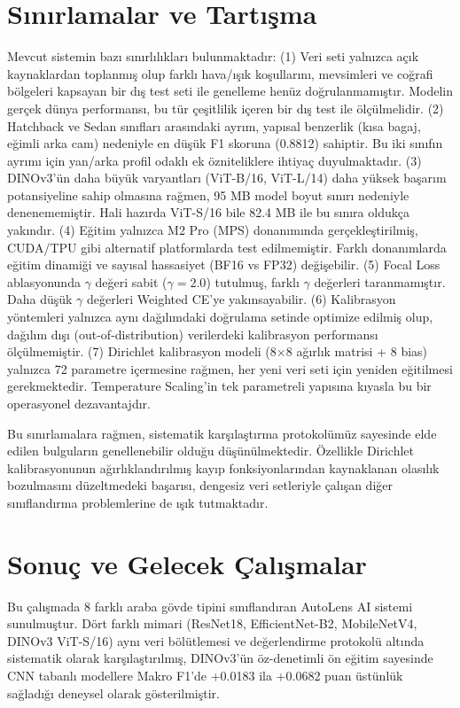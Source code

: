\documentclass[conference]{IEEEtran}
\begin{document}
\section{Sınırlamalar ve Tartışma}
Mevcut sistemin bazı sınırlılıkları bulunmaktadır:
(1) Veri seti yalnızca açık kaynaklardan toplanmış olup farklı hava/ışık koşullarını, mevsimleri ve coğrafi bölgeleri kapsayan bir dış test seti ile genelleme henüz doğrulanmamıştır. Modelin gerçek dünya performansı, bu tür çeşitlilik içeren bir dış test ile ölçülmelidir.
(2) Hatchback ve Sedan sınıfları arasındaki ayrım, yapısal benzerlik (kısa bagaj, eğimli arka cam) nedeniyle en düşük F1 skoruna (0.8812) sahiptir. Bu iki sınıfın ayrımı için yan/arka profil odaklı ek özniteliklere ihtiyaç duyulmaktadır.
(3) DINOv3'ün daha büyük varyantları (ViT-B/16, ViT-L/14) daha yüksek başarım potansiyeline sahip olmasına rağmen, 95 MB model boyut sınırı nedeniyle denenememiştir. Hali hazırda ViT-S/16 bile 82.4 MB ile bu sınıra oldukça yakındır.
(4) Eğitim yalnızca M2 Pro (MPS) donanımında gerçekleştirilmiş, CUDA/TPU gibi alternatif platformlarda test edilmemiştir. Farklı donanımlarda eğitim dinamiği ve sayısal hassasiyet (BF16 vs FP32) değişebilir.
(5) Focal Loss ablasyonunda $\gamma$ değeri sabit ($\gamma=2.0$) tutulmuş, farklı $\gamma$ değerleri taranmamıştır. Daha düşük $\gamma$ değerleri Weighted CE'ye yakınsayabilir.
(6) Kalibrasyon yöntemleri yalnızca aynı dağılımdaki doğrulama setinde optimize edilmiş olup, dağılım dışı (out-of-distribution) verilerdeki kalibrasyon performansı ölçülmemiştir.
(7) Dirichlet kalibrasyon modeli (8$\times$8 ağırlık matrisi + 8 bias) yalnızca 72 parametre içermesine rağmen, her yeni veri seti için yeniden eğitilmesi gerekmektedir. Temperature Scaling'in tek parametreli yapısına kıyasla bu bir operasyonel dezavantajdır.

Bu sınırlamalara rağmen, sistematik karşılaştırma protokolümüz sayesinde elde edilen bulguların genellenebilir olduğu düşünülmektedir. Özellikle Dirichlet kalibrasyonunun ağırlıklandırılmış kayıp fonksiyonlarından kaynaklanan olasılık bozulmasını düzeltmedeki başarısı, dengesiz veri setleriyle çalışan diğer sınıflandırma problemlerine de ışık tutmaktadır.

\section{Sonuç ve Gelecek Çalışmalar}
Bu çalışmada 8 farklı araba gövde tipini sınıflandıran AutoLens AI sistemi sunulmuştur. Dört farklı mimari (ResNet18, EfficientNet-B2, MobileNetV4, DINOv3 ViT-S/16) aynı veri bölütlemesi ve değerlendirme protokolü altında sistematik olarak karşılaştırılmış, DINOv3'ün öz-denetimli ön eğitim sayesinde CNN tabanlı modellere Makro F1'de +0.0183 ila +0.0682 puan üstünlük sağladığı deneysel olarak gösterilmiştir.
\end{document}
